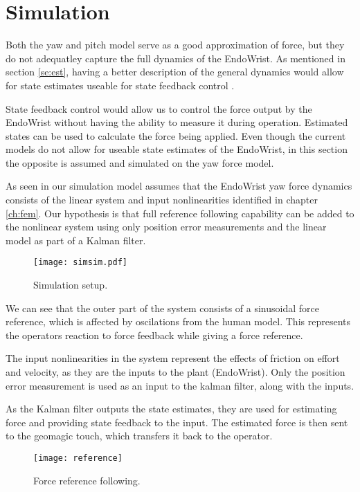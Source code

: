\section{Simulation}
Both the yaw and pitch model serve as a good approximation of force, but they do not adequatley capture the full dynamics of the EndoWrist.
As mentioned in section \ref{se:est}, having a better description of the general dynamics would allow for state estimates useable for state feedback control \cite{yue2004state}.

State feedback control would allow us to control the force output by the EndoWrist without having the ability to measure it during operation.
Estimated states can be used to calculate the force being applied.
Even though the current models do not allow for useable state estimates of the EndoWrist, in this section the opposite is assumed and simulated on the yaw force model.

As seen in  our simulation model assumes that the EndoWrist yaw force dynamics consists of the linear system and input nonlinearities identified in chapter \ref{ch:fem}.
Our hypothesis is that full reference following capability can be added to the nonlinear system using only position error measurements and the linear model as part of a Kalman filter.

\begin{figure}[H]\label{mdle}
\centering
\texttt{[image: simsim.pdf]}
\caption{Simulation setup.}
\label{figlowpass}
\end{figure}

We can see that the outer part of the system consists of a sinusoidal force reference, which is affected by oscilations from the human model. 
This represents the operators reaction to force feedback while giving a force reference.

The input nonlinearities in the system represent the effects of friction on effort and velocity, as they are the inputs to the plant (EndoWrist).
Only the position error measurement is used as an input to the kalman filter, along with the inputs.

As the Kalman filter outputs the state estimates, they are used for estimating force and providing state feedback to the input.
The estimated force is then sent to the geomagic touch, which transfers it back to the operator.

\begin{figure}[H]
\centering
\hspace{-2.5em}\texttt{[image: reference]}
\caption{Force reference following.}
\label{fig:freffl}
\end{figure}

